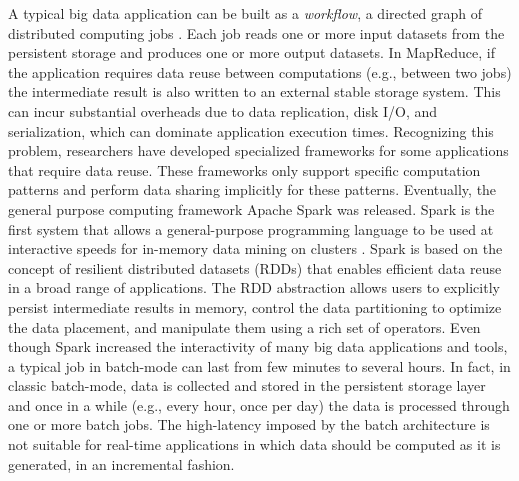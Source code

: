 A typical big data application can be built as a \emph{workflow}, a directed graph of distributed computing jobs \cite{bigdataatlinkedin}. Each job reads one or more input datasets from the persistent storage and produces one or more output datasets. In MapReduce, if the application requires data reuse between computations (e.g., between two jobs) the intermediate result is also written to an external stable storage system. This can incur substantial overheads due to data replication, disk I/O, and serialization, which can dominate application execution times. Recognizing this problem, researchers have developed specialized frameworks for some applications that require data reuse. These frameworks only support specific computation patterns and perform data sharing implicitly for these patterns. Eventually, the general purpose computing framework Apache Spark \cite{apachespark} was released. Spark is the first system that allows a general-purpose programming language to be used at interactive speeds for in-memory data mining on clusters \cite{apachespark}. Spark is based on the concept of resilient distributed datasets (RDDs) \cite{apachesparkrdd} that enables efficient data reuse in a broad range of applications. The RDD abstraction allows users to explicitly persist intermediate results in memory, control the data partitioning to optimize the data placement, and manipulate them using a rich set of operators. Even though Spark increased the interactivity of many big data applications and tools, a typical job in batch-mode can last from few minutes to several hours. In fact, in classic batch-mode, data is collected and stored in the persistent storage layer and once in a while (e.g., every hour, once per day) the data is processed through one or more batch jobs. The high-latency imposed by the batch architecture is not suitable for real-time applications in which data should be computed as it is generated, in an incremental fashion.

